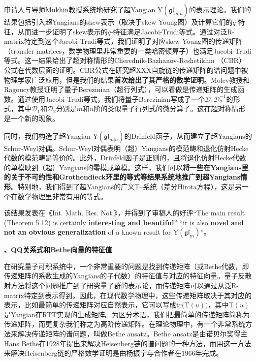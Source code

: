 \documentclass[12pt,UTF8,AutoFakeBold=4,a4paper]{ctexart}
\begin{document}
申请人与导师Mukhin教授系统地研究了超Yangian $\mathrm{Y}(\mathfrak{gl}_{m|n})$的表示理论。我们的结果包括引入超Yangians的skew表示（取决于skew Young图）及计算它们的$q$-特征，从而进一步证明了skew表示的$q$-特征满足Jacobi-Trudi等式。通过对泛R-matrix特定到这个Jacobi-Trudi等式，我们证明了对应skew Young图的传递矩阵（transfer matrices，数学物理里非常重要的一类哈密顿算子）也满足Jacobi-Trudi等式。这一结果给出了超对称情形的Cherednik-Bazhanov-Reshetikhin （CBR）公式在代数层面的证明。CBR公式在研究超XXX自旋链的传递矩阵的谱问题中被物理学家广泛应用，但是我们的结果\textbf{首次给出了其严格的数学证明}。Molev教授和Ragoucy教授证明了量子Berezinian（超行列式），可以看做是传递矩阵的生成函数。通过使用Jacobi-Trudi等式，我们将量子Berezinian写成了一个$\mathcal D_1\mathcal D_2^{-1}$的形式，其中$\mathcal D_1$和$\mathcal D_2$分别是$m$和$n$阶的类似量子行列式的微分算子。这在超对称情形是一个新的现象。

同时，我们构造了超Yangian $\mathrm{Y}(\mathfrak{gl}_{m|n})$的Drinfeld函子，从而建立了超Yangians的Schur-Weyl对偶。Schur-Weyl对偶表明（超）Yangians的模范畴和退化仿射Hecke代数的模范畴是等价的。此外，Drinfeld函子是正则的，且将退化仿射Hecke代数的单模映到（超）Yangians的零模或单模。这样，我们可以\textbf{将一些在Yangians里的关于不可约性和Grothendieck环里的等式等结果系统地推广到超Yangians情形}。特别地，我们得到了超Yangians的广义T--系统（差分Hirota方程），这是另一个在数学物理里非常有用的等式。

该结果发表在《Int. Math. Res. Not.》，并得到了审稿人的好评“The main result (Theorem 5.12) is certainly \textbf{interesting and
beautiful}” “it is also \textbf{novel and not an obvious generalization} of a known
result for $\mathrm{Y}(\mathfrak{gl}_m)$”。


\medskip

\textbf{、QQ关系式和Bethe向量的特征值}

在研究量子可积系统中，一个非常重要的问题是找到传递矩阵（或Bethe代数，即传递矩阵的系数生成的Yangians的子代数）的特征值与对应的特征向量。量子反散射方法将这个问题推广到了研究量子群的表示论，而传递矩阵可以通过从泛R-matrix特定到表示得到。因此，在现代数学物理中，这些传递矩阵取决于其对应的表示，比如最简单的传递矩阵对应自然表示，它可以写成$\mathrm{tr}\big(\mathrm T(u)\big)$，其中$\mathrm T(u)$是Yangian在RTT实现的生成矩阵。为区分术语，我们把最简单的传递矩阵简称为传递矩阵，而更复杂我们称之为高阶传递矩阵。在理论物理中，有一个非常系统方法来解决传递矩阵的谱问题，叫做Bethe ansatz。Bethe ansatz是由诺贝尔奖得主Hans Bethe在1928年提出来解决Heisenberg链的谱问题的一种方法，而用这一方法来解决Heisenberg链的严格数学证明是由杨振宁与合作者在1966年完成。
\end{document}
